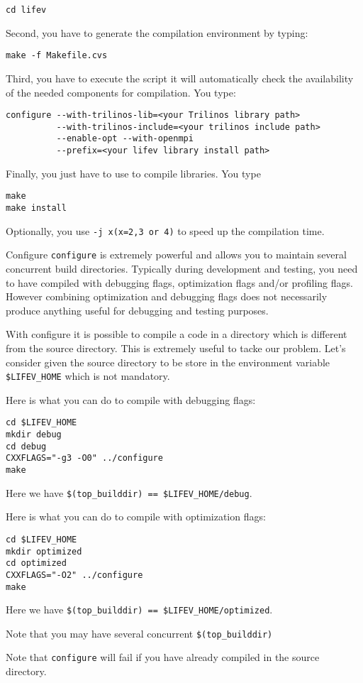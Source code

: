 \begin{verbatim}
cd lifev
\end{verbatim}

\noindent Second, you have to generate the compilation environment by typing:
\begin{verbatim}
make -f Makefile.cvs
\end{verbatim}

\noindent Third, you have to execute the script
it will automatically check the availability of the needed components
for \lifev compilation. You type:

\begin{verbatim}
configure --with-trilinos-lib=<your Trilinos library path>
          --with-trilinos-include=<your trilinos include path>
          --enable-opt --with-openmpi
          --prefix=<your lifev library install path>
\end{verbatim}

\noindent Finally, you just have to use  to compile \lifev libraries. You type
\begin{verbatim}
make
make install
\end{verbatim}
Optionally, you use \verb!-j x(x=2,3 or 4)! to speed up the compilation time.

\begin{hint}{Configure}
  \label{hint:configure}
  \verb!configure! is extremely powerful and allows you to maintain
  several concurrent build directories. Typically during development
  and testing, you need to have \lifev compiled with debugging flags,
  optimization flags and/or profiling flags. However combining
  optimization and debugging flags does not necessarily produce
  anything useful for debugging and testing purposes.

  With configure it is possible to compile a code in a directory which
  is different from the source directory. This is extremely useful to
  tacke our problem. Let's consider given the source directory to be
  store in the environment variable \verb!$LIFEV_HOME! which is not
  mandatory.

Here is what you can do to compile with debugging flags:
\begin{verbatim}
cd $LIFEV_HOME
mkdir debug
cd debug
CXXFLAGS="-g3 -O0" ../configure
make
\end{verbatim}
Here we have \verb+$(top_builddir) == $LIFEV_HOME/debug+.

Here is what you can do to compile with optimization flags:
\begin{verbatim}
cd $LIFEV_HOME
mkdir optimized
cd optimized
CXXFLAGS="-O2" ../configure
make
\end{verbatim}
Here we have \verb+$(top_builddir) == $LIFEV_HOME/optimized+.

\noindent Note that you may have several concurrent \verb+$(top_builddir)+

\noindent Note that \verb!configure! will fail if you have already compiled
\lifev in the source directory.


\end{hint}


